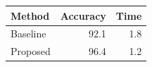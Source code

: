 \begin{tabular}{lrr}
\toprule
Method & Accuracy & Time\\
\midrule
Baseline & 92.1 & 1.8\\
Proposed & 96.4 & 1.2\\
\bottomrule
\end{tabular}
